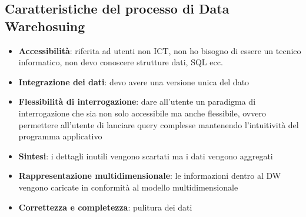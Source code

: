 \subsection{Caratteristiche del processo di Data Warehosuing}
\begin{itemize}
	\item 
	\textbf{Accessibilità}: riferita ad utenti non ICT, non ho bisogno di essere un tecnico informatico, non devo conoscere strutture dati, SQL ecc.
	\item 
	\textbf{Integrazione dei dati}: devo avere una versione unica del dato
	\item 
	\textbf{Flessibilità di interrogazione}: dare all’utente un paradigma di interrogazione che sia non solo accessibile ma anche flessibile, ovvero permettere all’utente di lanciare query complesse mantenendo l’intuitività del programma applicativo
	\item 
	\textbf{Sintesi}: i dettagli inutili vengono scartati ma i dati vengono aggregati
	\item 
	\textbf{Rappresentazione multidimensionale}: le informazioni dentro al DW  vengono caricate in conformità al modello multidimensionale
	\item 
	\textbf{Correttezza e completezza}: pulitura dei dati
\end{itemize}